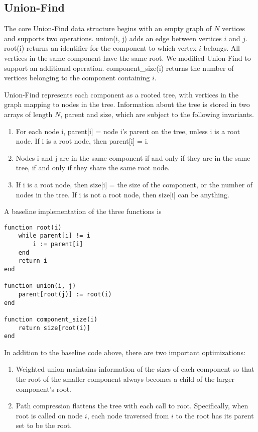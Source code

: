 \subsection{Union-Find}

The core Union-Find data structure begins with an empty graph of $N$
vertices and supports two operations. union(i, j) adds an edge between
vertices $i$ and $j$. root(i) returns an identifier for the component
to which vertex $i$ belongs. All vertices in the same component have the
same root. We modified Union-Find to support an additional operation.
component\_size(i) returns the number of vertices belonging to the
component containing $i$.

Union-Find represents each component as a rooted tree, with vertices in
the graph mapping to nodes in the tree. Information about the tree is
stored in two arrays of length $N$, parent and size, which are subject
to the following invariants.

\begin{enumerate}[1.]
\item
For each node i, parent[i] = node i's parent on the tree, unless i is a
root node. If i is a root node, then parent[i] = i.

\item
Nodes i and j are in the same component if and only if they are in the
same tree, if and only if they share the same root node.

\item
If i is a root node, then size[i] = the size of the component, or the
number of nodes in the tree. If i is not a root node, then size[i] can
be anything.
\end{enumerate}

A baseline implementation of the three functions is

\begin{verbatim}
function root(i)
    while parent[i] != i
        i := parent[i]
    end
    return i
end

function union(i, j)
    parent[root(j)] := root(i)
end

function component_size(i)
    return size[root(i)]
end
\end{verbatim}

In addition to the baseline code above, there are two important
optimizations:

\begin{enumerate}[1.]
\item
Weighted union maintains information of the sizes of each component so
that the root of the smaller component always becomes a child of the
larger component's root.

\item
Path compression flattens the tree with each call to root. Specifically,
when root is called on node $i$, each node traversed from $i$ to the
root has its parent set to be the root.
\end{enumerate}

